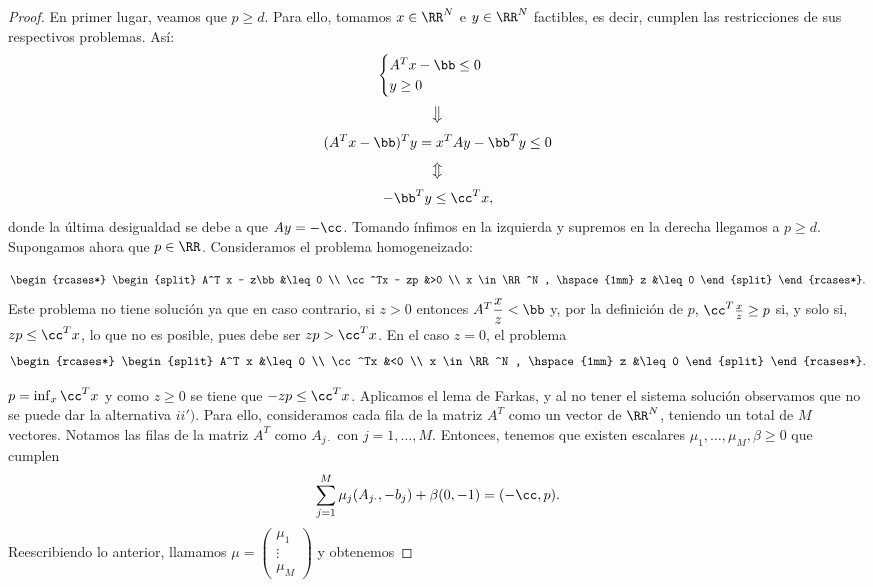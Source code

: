 \begin{proof}
	En primer lugar, veamos que $ p \geq d $. Para ello, tomamos $ x \in \RR^N$ e $ y \in \RR^N $ factibles, es decir, cumplen las restricciones de sus respectivos problemas. Así:
	\[
	\begin{cases}
	A^T x - \bb \leq 0 \\
	y \geq 0
	\end{cases}
	\]
	\[
	\big\Downarrow
	\]
	\[
	(A^T x -\bb)^Ty =x^TAy -\bb^Ty\leq 0
	\]
	\[
	\big\Updownarrow
	\]
	\[
	-\bb^Ty\leq \cc^T x,
	\]
	donde la última desigualdad se debe a que $ Ay = -\cc $. Tomando ínfimos en la izquierda y supremos en la derecha llegamos a $ p \geq d $. \\
	
	Supongamos ahora que $ p \in \RR $. Consideramos el problema homogeneizado:
	
	\begin{equation*}
	\begin{rcases*}
	\begin{split} 
	A^T x - z\bb&\leq 0  \\
	\cc^Tx  - zp &>0  \\
	x \in \RR^N , \hspace{1mm} z &\leq 0
	\end{split}
	\end{rcases*}.
	\end{equation*}
	Este problema no tiene solución ya que en caso contrario, si $ z > 0 $ entonces $ A^T \displaystyle \frac{x}{z} < \bb$ y, por la definición de $ p $, $ \cc^T \frac{x}{z} \geq p $ si, y solo si, $ zp \leq \cc^T x $, lo que no es posible, pues debe ser $ zp > \cc^Tx $. En el caso $ z=0 $, el problema\\
	\begin{equation*}
	\begin{rcases*}
	\begin{split} 
	A^T x &\leq 0  \\
	\cc^Tx &<0  \\
	x \in \RR^N , \hspace{1mm} z &\leq 0
	\end{split}
	\end{rcases*}.
	\end{equation*}
	
	 $ p= \inf_{x} \cc^T x $ y como $ z \geq 0 $ se tiene que $ -zp \leq \cc^T x $. Aplicamos el lema de Farkas, y al no tener el sistema solución observamos que no se puede dar la alternativa $ ii') $. Para ello, consideramos cada fila de la matriz $ A^T $ como un vector de $ \RR^N $, teniendo un total de $ M $ vectores. Notamos las filas de la matriz $ A^T $ como $ A_{j\cdot} $ con $ j=1,\dots,M $. Entonces, tenemos que existen escalares $\mu_1,\dots,\mu_M,\beta \geq 0 $ que cumplen
	\[
	\sum_{j=1}^{M}\mu_j (A_{j\cdot},-b_j) + \beta(0,-1) = (-\cc,p).
	\]
	Reescribiendo lo anterior, llamamos $ \mu = \begin{pmatrix}
	\mu_{1} \\
	\vdots \\
	\mu_{M}
	\end{pmatrix} $ y obtenemos
	

\end{proof}
